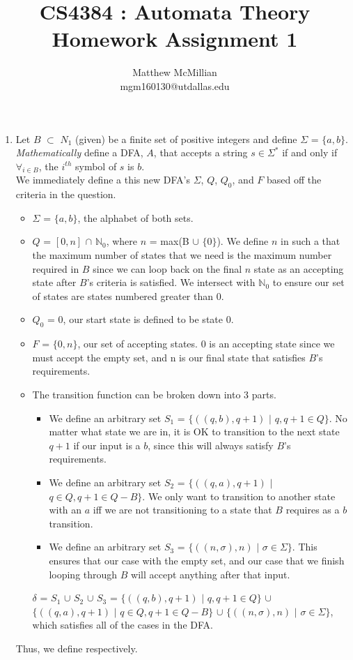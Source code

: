 \documentclass[12pt]{article}
\begin{document}
\title{CS4384 : Automata Theory\\Homework Assignment 1}
\author{Matthew McMillian\\mgm160130@utdallas.edu}
\maketitle


\begin{enumerate}
	
	\item Let $B$ $\subset$ $N_1$ (given) be a finite set of positive integers and define $\Sigma$ = $\{a, b\}$. \textit{Mathematically} define a DFA, $A$, that accepts a string $s \in \Sigma^*$ if and only if $\forall_{i \in B}$, the $i^{th}$ symbol of $s$ is $b$. \\
	
	We immediately define a this new DFA's $\Sigma$, $Q$, $Q_0$, and $F$ based off the criteria in the question. 
	\begin{itemize}
		\item[] $\Sigma$ = $\{a, b\}$, the alphabet of both sets.
		\item[] $Q$ = $[0, n]$ $\cap$ $\mathbb{N}_0$, where $n$ = max(B $\cup$ $\{0\}$). We define $n$ in such a that the maximum number of states that we need is the maximum number required in $B$ since we can loop back on the final $n$ state as an accepting state after $B$'s criteria is satisfied. We intersect with $\mathbb{N}_0$ to ensure our set of states are states numbered greater than 0.
		\item[] $Q_0$ = 0, our start state is defined to be state 0.
		\item[] $F$ = $\{0, n\}$, our set of accepting states. 0 is an accepting state since we must accept the empty set, and n is our final state that satisfies $B$'s requirements.
		\item[] The transition function can be broken down into 3 parts.
			\begin{itemize}
				\item We define an arbitrary set $S_1$ = $\{((q,b), q+1)$ $|$ $q, q+1 \in Q \}$. No matter what state we are in, it is OK to transition to the next state $q+1$ if our input is a $b$, since this will always satisfy $B$'s requirements.
				\item We define an arbitrary set $S_2$ = $\{((q,a), q+1)$ $|$ $q \in Q, q+1 \in Q - B \}$. We only want to transition to another state with an $a$ iff we are not transitioning to a state that $B$ requires as a $b$ transition.
				\item We define an arbitrary set $S_3$ = $\{((n,\sigma), n)$ $|$ $\sigma \in \Sigma\}$. This ensures that our case with the empty set, and our case that we finish looping through $B$ will accept anything after that input.
			\end{itemize}
		$\delta$ = $S_1$ $\cup$ $S_2$ $\cup$ $S_3$ = $\{((q,b), q+1)$ $|$ $q, q+1 \in Q \}$ $\cup$ $\{((q,a), q+1)$ $|$ $q \in Q, q+1 \in Q - B \}$ $\cup$ $\{((n,\sigma), n)$ $|$ $\sigma \in \Sigma\}$, which satisfies all of the cases in the DFA.
	\end{itemize}
	Thus, we define  respectively.
	\pagebreak
	

\end{enumerate}
\end{document}
